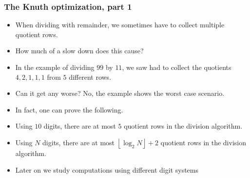 \begin{frame}
\frametitle{The Knuth optimization, part 1}
\begin{itemize}
\item When dividing with remainder, we sometimes have to collect multiple quotient rows.
\item How much of a slow down does this cause?
\item In the example of dividing $99$ by $11$, we saw had to collect the quotients $4,2,1,1,1$ from $5$ different rows.
\item Can it get any worse? No, the example shows the worst case scenario.
\item In fact, one can prove the following.
\end{itemize}
\begin{lemma}
\begin{itemize}
\item Using $10$ digits, there are at most $5$ quotient rows in the division algorithm.
\item Using $N$ digits, there are at most $\left\lfloor \log_2 N\right\rfloor + 2$ quotient rows in the division algorithm.
\end{itemize}
\end{lemma}
\begin{itemize}
\item Later on we study computations using different digit systems 
\end{itemize}

\end{frame}